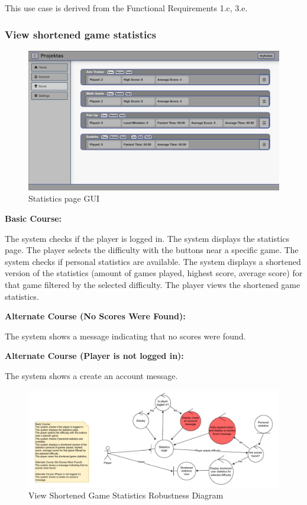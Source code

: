\documentclass[11pt,a4paper]{article}
\newcommand{\heading}[1]{\vspace{1em}\noindent\textbf{#1}\par\vspace{0.5em}}
\begin{document}
This use case is derived from the Functional Requirements 1.c, 3.e.

\subsubsection{View shortened game statistics}

\begin{figure}[H]
    \centering
    \includegraphics[width=1\textwidth,keepaspectratio]{PSI_3rd_trial/PNGs/score_page.png}
    \caption{Statistics page GUI}
    \label{fig:score_page}
\end{figure}


\heading{Basic Course:}
The system checks if the player is logged in. The system displays the statistics page. The player selects the difficulty with the buttons near a specific game. The system checks if personal statistics are available. The system displays a shortened version of the statistics (amount of games played, highest score, average score) for that game filtered by the selected difficulty. The player views the shortened game statistics.

\heading{Alternate Course (No Scores Were Found):}
The system shows a message indicating that no scores were found.

\heading{Alternate Course (Player is not logged in):}
The system shows a create an account message.

\begin{figure}[H]
    \centering
    \includegraphics[width=1\textwidth,keepaspectratio]{PSI_3rd_trial/robustness/short_stats.drawio.pdf}
    \caption{View Shortened Game Statistics Robustness Diagram}
    \label{fig:shortened_statistics_view_diagram}
\end{figure}
\end{document}
